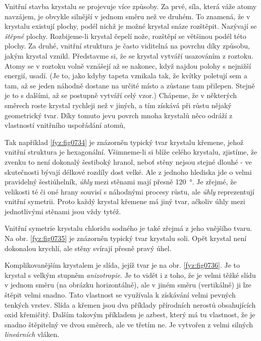     Vnitřní stavba krystalu se projevuje více způsoby. Za prvé, síla, která váže atomy navzájem, je 
    obvykle silnější v jednom směru než ve druhém. To znamená, že v krystalu existují plochy, podél 
    nichž je možné krystal snáze rozštěpit. Nazývají se \emph{štěpné} plochy. Rozbijeme-li krystal 
    čepelí nože, rozštěpí se většinou podél této plochy. Za druhé, vnitřní struktura je často 
    viditelná na povrchu díky způsobu, jakým krystal vznikl. Představme si, že se krystal vytváří 
    usazováním z roztoku. Atomy se v roztoku volně vznášejí až se nakonec, když najdou polohy s 
    nejnižší energií, usadí. (Je to, jako kdyby tapeta vznikala tak, že kvítky poletují sem a tam, 
    až se jeden náhodně dostane na určité místo a zůstane tam přilepen. Stejně je to s dalšími, až 
    se postupně vytváří celý vzor.) Chápeme, že v některých směrech roste krystal rychleji než v 
    jiných, a tím získává při růstu nějaký geometrický tvar. Díky tomuto jevu povrch mnoha krystalů 
    něco odráží z vlastností vnitřního uspořádání atomů,
    
    Tak například \ref{fyz:fig0734} je znázorněn typický tvar krystalu křemene, jehož vnitřní
    struktura je hexagonální. Všimneme-li si blíže celého krystalu, zjistíme, že zvenku to není
    dokonalý šestiboký hranol, neboť stěny nejsou stejné dlouhé - ve skutečnosti bývají délkové
    rozdíly dost velké. Ale z jednoho hlediska jde o velmi pravidelný šestiúhelník, \emph{úhly} mezi
    stěnami mají přesně \qty{120}{\degree}. Je zřejmé, že velikosti té či oné hrany souvisí s
    náhodnými procesy růstu, ale \emph{úhly} reprezentují vnitřní symetrii. Proto každý krystal
    křemene má jiný tvar, ačkoliv úhly mezi jednotlivými stěnami jsou vždy tytéž. 
    
    Vnitřní symetrie krystalu chloridu sodného je také zřejmá z jeho vnějšího tvaru. Na obr. 
    \ref{fyz:fig0735} je znázorněn typický tvar krystalu soli. Opět krystal není dokonalou krychlí, 
    ale stěny svírají přesně pravý úhel. 
    
    Komplikovanějším krystalem je slída, jejíž tvar je na obr. \ref{fyz:fig0736}. Je to krystal s 
    velkým stupněm \emph{anizotropie}. Je to vidět i z toho, že je velmi těžké slídu v jednom směru 
    (na obrázku horizontálně), ale v jiném směru (vertikálně) ji lze štěpit velmi snadno. Tato 
    vlastnost se využívala k získávání velmi pevných tenkých vrstev. Slída a křemen jsou dva 
    příklady přírodních nerostů obsahujících oxid křemičitý. Dalším takovým příkladem je azbest, 
    který má tu vlastnost, že je snadno štěpitelný ve dvou směrech, ale ve třetím ne. Je vytvořen z 
    velmi silných \emph{lineárních} vláken. 
    
